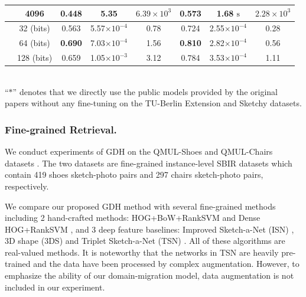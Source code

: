 \documentclass[runningheads]{llncs}
\begin{document}
\begin{table}[t]
{\begin{tabular}{c|c||c|c|c||c|c|c}
\hline
{}&4096 &0.448  &5.35  &$6.39\times10^3$ &0.573 & 1.68  $\mathrm{s}$&$2.28\times10^3$ \\
\hline
\hline
{}  &32 (bits)&0.563  &5.57$\times 10^{-4}$   &0.78 &0.724  &2.55$\times 10^{-4}$  &0.28 \\
&64 (bits)&\textbf{0.690}  &7.03$\times 10^{-4}$  &1.56  &\textbf{0.810}  &2.82$\times 10^{-4}$  &0.56 \\
&128 (bits)&0.659&1.05$\times 10^{-3}$  &3.12  &0.784  & 3.53$\times 10^{-4}$ &1.11 \\
\hline
\end{tabular}
}\scriptsize
\\``$\ast$'' denotes that we directly use the public models provided by the original papers without any fine-tuning on the TU-Berlin Extension and Sketchy datasets.
\label{table:t1}
\vspace{-2ex}
\end{table}

\vspace{-2ex}
\subsubsection{Fine-grained Retrieval.} We conduct experiments of GDH on the QMUL-Shoes and QMUL-Chairs datasets \cite{Yu2016shoes}. %
The two datasets are  fine-grained instance-level SBIR datasets which contain 419 shoes sketch-photo pairs and 297 chairs sketch-photo pairs, respectively.

We compare our proposed GDH method with several fine-grained methods including 2 hand-crafted methods: 
HOG+BoW+RankSVM \cite{LiHSG15} and Dense HOG+RankSVM \cite{Yu2016shoes}, 
and 3 deep feature baselines: Improved Sketch-a-Net (ISN) \cite{sketchanet}, 
3D shape (3DS) \cite{WangKL15} and Triplet Sketch-a-Net (TSN) \cite{Yu2016shoes}. 
All of these algorithms are real-valued methods.
It is noteworthy that the networks in TSN \cite{Yu2016shoes} are heavily pre-trained and the data have been processed by complex augmentation. However, to emphasize the ability of our domain-migration model, data augmentation is not included in our experiment. 
\end{document}
